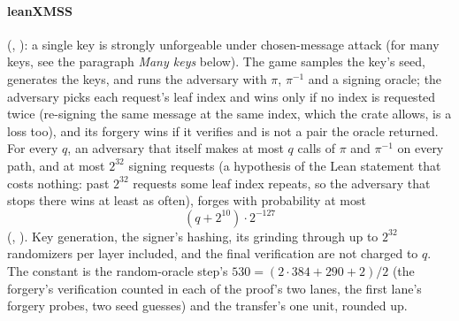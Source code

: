 \documentclass[11pt]{article}
\begin{document}
\paragraph{leanXMSS} (,
): a single key is strongly unforgeable under chosen-message attack
(for many keys, see the paragraph \emph{Many keys} below).
The game samples the key's seed, generates the keys, and runs the adversary with $\pi$,
$\pi^{-1}$ and a signing oracle; the adversary picks each request's leaf index and wins
only if no index is requested twice (re-signing the same message at the same index, which the crate allows, is a loss too), and its forgery wins if it verifies and is not a pair the
oracle returned. For every $q$, an adversary that itself makes at most $q$ calls of $\pi$ and
$\pi^{-1}$ on every path, and at most $2^{32}$ signing requests (a hypothesis of the Lean statement that costs nothing: past $2^{32}$ requests some leaf index repeats, so the adversary that stops there wins at least as often),
forges with probability at most
\[
\boxed{\ (q + 2^{10})\cdot 2^{-127}\ }
\]
(, ). Key
generation, the signer's hashing, its grinding through up to $2^{32}$ randomizers per layer
included, and the final verification are not charged to $q$. The constant is the random-oracle
step's $530 = (2\cdot384 + 290 + 2)/2$ (the forgery's verification counted in each of the proof's two
lanes, the first lane's forgery probes, two seed guesses) and the transfer's one unit, rounded up.
\end{document}
